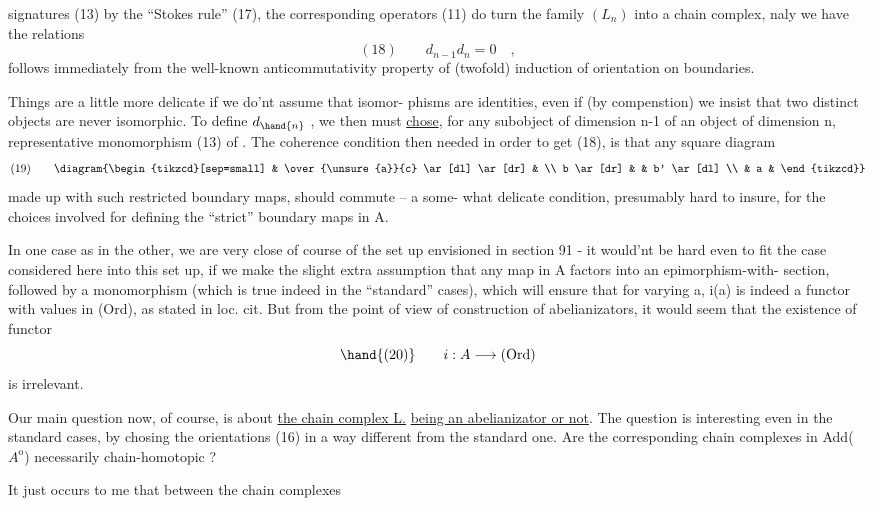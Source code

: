 
signatures (13) by the ``Stokes rule'' (17), the corresponding operators
(11) do turn the family $(L_n)$ into a chain complex, naly we have
the relations
\[ (18) \qquad d_{n-1}d_n = 0 \quad , \]
 follows immediately from the well-known anticommutativity property
of  (twofold) induction of orientation on boundaries.

Things are a little more delicate if we do'nt assume that isomor-%
phisms are identities, even if (by compenstion) we  insist that two
distinct objects are never isomorphic. To define $d_{\hand{n}}$ , we then must
\uline{chose}, for any subobject  of dimension n-1 of  an object  of
dimension n,   representative monomorphism (13) of \hand{$\beta$}. The coherence
condition then needed in order to get (18), is that  any 
square diagram
\[ (19) \qquad \diagram{\begin{tikzcd}[sep=small]
 & \over{\unsure{a}}{c} \ar[dl] \ar[dr] & \\
 b \ar[dr] & & b' \ar[dl] \\
 & a &
\end{tikzcd}} \]
made up with such restricted boundary maps, should commute -- a some-%
what delicate condition, presumably hard to insure, for the choices
involved for defining the ``strict'' boundary maps in A.

In one case as in the other, we are very close of course of the
set up envisioned in section 91 - it would'nt be hard even to 
fit the case considered here into this set up, if we make the slight
extra assumption that any map in A factors into an epimorphism-with-%
section, followed by a monomorphism (which is true indeed in the
``standard'' cases), which will ensure that for varying a, i(a) is indeed
a functor with values in (Ord), as stated in loc. cit. But from the
point of view of construction of abelianizators, it would seem that
the existence of  functor
\[ \hand{(20)} \qquad i: A \longrightarrow (\mathrm{Ord}) \]
is irrelevant.

Our main question now, of course, is about \uline{the chain complex L.}
\uline{being an abelianizator or not}. The question is interesting even in the
standard cases, by chosing the orientations (16) in a way different
from the standard one. Are the corresponding chain complexes in
Add($A^{\mathrm{o}}$) necessarily chain-homotopic ?

It just occurs to me that  between the chain complexes

